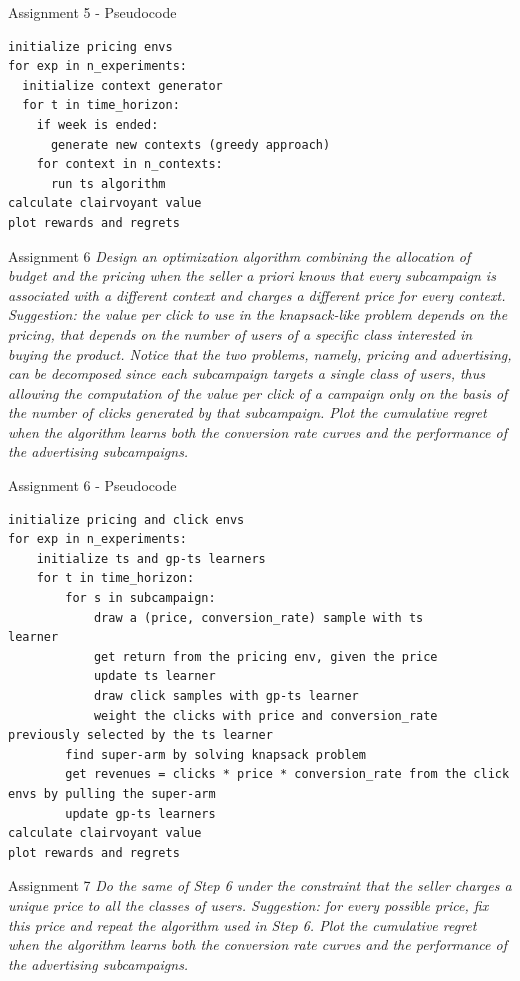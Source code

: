 \documentclass[11pt]{beamer}
\begin{document}
\begin{frame}[fragile]{Assignment 5 - Pseudocode}
\begin{lstlisting}
initialize pricing envs
for exp in n_experiments:
  initialize context generator 
  for t in time_horizon:
    if week is ended:
      generate new contexts (greedy approach)
    for context in n_contexts:
      run ts algorithm
calculate clairvoyant value
plot rewards and regrets
\end{lstlisting}
\end{frame}

\begin{frame}{Assignment 6}
\textit{Design an optimization algorithm combining the allocation of budget and the pricing when the seller a priori knows that every subcampaign is associated with a different context and charges a different price for every context. Suggestion: the value per click to use in the knapsack-like problem depends on the pricing, that depends on the number of users of a specific class interested in buying the product. Notice that the two problems, namely, pricing and advertising, can be decomposed since each subcampaign targets a single class of users, thus allowing the computation of the value per click of a campaign only on the basis of the number of clicks generated by that subcampaign. Plot the cumulative regret when the algorithm learns both the conversion rate curves and the performance of the advertising subcampaigns.}
\end{frame}

\begin{frame}[fragile]{Assignment 6 - Pseudocode}
\begin{lstlisting}
initialize pricing and click envs
for exp in n_experiments:
	initialize ts and gp-ts learners 
	for t in time_horizon:
		for s in subcampaign:
			draw a (price, conversion_rate) sample with ts		learner
			get return from the pricing env, given the price
			update ts learner
			draw click samples with gp-ts learner
			weight the clicks with price and conversion_rate	previously selected by the ts learner
		find super-arm by solving knapsack problem
		get revenues = clicks * price * conversion_rate from the click envs by pulling the super-arm
		update gp-ts learners 
calculate clairvoyant value
plot rewards and regrets
\end{lstlisting}
\end{frame}

\begin{frame}{Assignment 7}
\textit{Do the same of Step 6 under the constraint that the seller charges a unique price to all the classes of users. Suggestion: for every possible price, fix this price and repeat the algorithm used in Step 6. Plot the cumulative regret when the algorithm learns both the conversion rate curves and the performance of the advertising subcampaigns.}
\end{frame}
\end{document}

